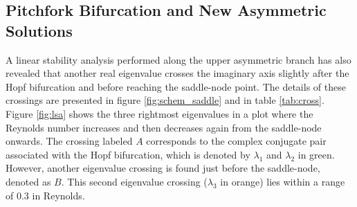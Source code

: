 \subsection{Pitchfork Bifurcation and New Asymmetric Solutions}

A linear stability analysis performed along the upper asymmetric branch has
also revealed that another real eigenvalue crosses the imaginary axis slightly
after the Hopf bifurcation and before reaching the saddle-node point. The
details of these crossings are presented in figure \ref{fig:schem_saddle} and
in table \ref{tab:cross}. Figure \ref{fig:lsa} shows the three rightmost
eigenvalues in a plot where the Reynolds number increases and then decreases
again from the saddle-node onwards. The crossing labeled $A$ corresponds to the
complex conjugate pair associated with the Hopf bifurcation, which is denoted
by $\lambda_1$ and $\lambda_2$ in green. However, another eigenvalue crossing
is found just before the saddle-node, denoted as $B$. This second eigenvalue
crossing ($\lambda_3$ in orange) lies within a range of $0.3$ in Reynolds. \\\\

